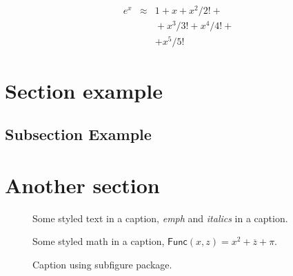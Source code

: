\lipsum*[65]
\begin{eqnarray}
 e^x &\approx& 1+x+x^2/2! + \\
   && {}+x^3/3! + x^4/4! + \\
   && + x^5/5!
\end{eqnarray}

\section{Section example}
\lipsum[47]

\subsection{Subsection Example}
\lipsum[56]

\section{Another section}
\lipsum[55-56]

\begin{figure}
\framebox[\textwidth]{\parbox{\textwidth}{\lipsum[65]}}
\caption{Some styled text in a caption, \emph{emph} and \textit{italics} in a caption.}
\end{figure}

\begin{figure}
\framebox[\textwidth]{\parbox{\textwidth}{\lipsum[65]}}
\caption{Some styled math in a caption, $\mathsf{Func}(x, z) = x^2 + \overline{z} + \pi$.}
\end{figure}

\begin{figure}
\centering
{}
\hfill
{}
\caption{Caption using subfigure package.}
\end{figure}



